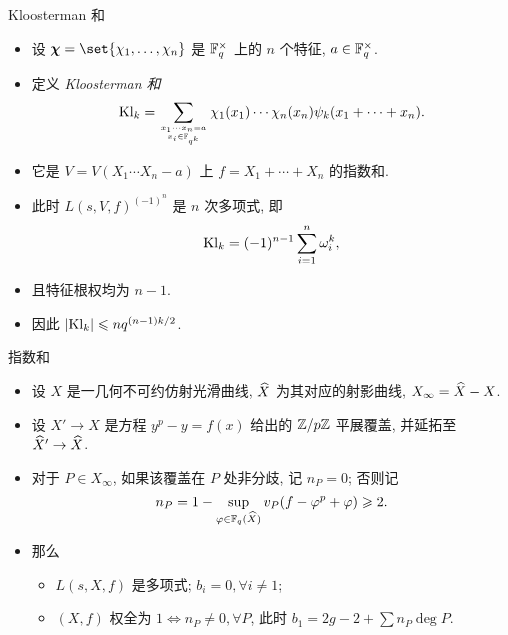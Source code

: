 \documentclass[aspectratio=169,handout]{ctexbeamer}
\newcommand\bchi{{\boldsymbol\chi}}
\begin{document}
\begin{frame}{Kloosterman 和}
	\beqskip{4pt}
	\onslide<+->
	\begin{example}
		\begin{itemize}
			\item 设 $\bchi=\set{\chi_1,\dots,\chi_n}$ 是 ${\mathbb{F}}_q^\times$ 上的 $n$ 个特征, $a\in{\mathbb{F}}_q^\times$.
			\item 定义 \emph{Kloosterman 和}
			\[
				{\mathrm{Kl}}_k=\sum_{x_1\cdots x_n=a\atop x_i\in{\mathbb{F}}_{q^k}}\chi_1(x_1)\cdots\chi_n(x_n)\psi_k(x_1+\cdots+x_n).
			\]
			\item 它是 $V=V(X_1\cdots X_n-a)$ 上 $f=X_1+\cdots+X_n$ 的指数和.
			\item 此时 $L(s,V,f)^{(-1)^n}$ 是 $n$ 次多项式, 即
			\[
				{\mathrm{Kl}}_k=(-1)^{n-1}\sum_{i=1}^n \omega_i^k,
			\]
			\item 且特征根权均为 $n-1$.
			\item 因此 $|{\mathrm{Kl}}_k|\leqslant nq^{(n-1)k/2}$.
		\end{itemize}
	\end{example}
	\endgroup
\end{frame}


\begin{frame}{指数和}
	\onslide<+->
	\begin{example}[][Serre1977]
		\begin{itemize}
			\item 设 $X$ 是一几何不可约仿射光滑曲线, $\widehat X$ 为其对应的射影曲线, $X_\infty=\widehat X-X$.
			\item 设 $X'\to X$ 是方程 $y^p-y=f(x)$ 给出的 ${\mathbb{Z}}/p{\mathbb{Z}}$ 平展覆盖, 并延拓至 $\widehat X'\to \widehat X$.
			\item 对于 $P\in X_\infty$, 如果该覆盖在 $P$ 处非分歧, 记 $n_P=0$; 否则记
			\[
				n_P=1-\sup_{\varphi\in{\mathbb{F}}_q(\widehat X)} v_P(f-\varphi^p+\varphi)\geqslant 2.
			\]
			\item 那么
			\begin{itemize}
				\item $L(s,X,f)$ 是多项式; $b_i=0, \forall i\neq 1$;
				\item $(X,f)$ 权全为 $1 \iff n_P\neq 0,\forall P$, 此时 $b_1=2g-2+\sum n_P\deg P$.
			\end{itemize}
		\end{itemize}
	\end{example}
\end{frame}
\end{document}
